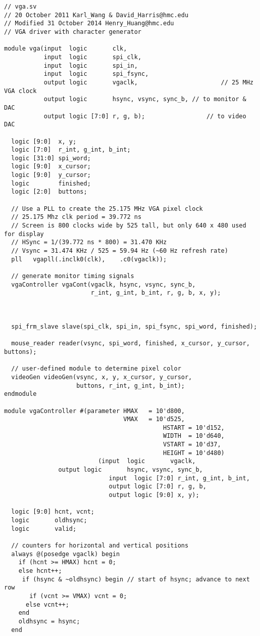 \documentclass{article}
\begin{document}
\begin{verbatim}
// vga.sv
// 20 October 2011 Karl_Wang & David_Harris@hmc.edu
// Modified 31 October 2014 Henry_Huang@hmc.edu
// VGA driver with character generator

module vga(input  logic       clk,
           input  logic       spi_clk,
           input  logic       spi_in,
           input  logic       spi_fsync,
           output logic       vgaclk,						// 25 MHz VGA clock
           output logic       hsync, vsync, sync_b,	// to monitor & DAC
           output logic [7:0] r, g, b);					// to video DAC
 
  logic [9:0]  x, y;
  logic [7:0]  r_int, g_int, b_int;
  logic [31:0] spi_word;
  logic [9:0]  x_cursor;
  logic [9:0]  y_cursor;
  logic        finished;
  logic [2:0]  buttons;
	
  // Use a PLL to create the 25.175 MHz VGA pixel clock 
  // 25.175 Mhz clk period = 39.772 ns
  // Screen is 800 clocks wide by 525 tall, but only 640 x 480 used for display
  // HSync = 1/(39.772 ns * 800) = 31.470 KHz
  // Vsync = 31.474 KHz / 525 = 59.94 Hz (~60 Hz refresh rate)
  pll	vgapll(.inclk0(clk),	.c0(vgaclk)); 

  // generate monitor timing signals
  vgaController vgaCont(vgaclk, hsync, vsync, sync_b,  
                        r_int, g_int, b_int, r, g, b, x, y);
	

  
  spi_frm_slave slave(spi_clk, spi_in, spi_fsync, spi_word, finished);
  
  mouse_reader reader(vsync, spi_word, finished, x_cursor, y_cursor, buttons);
  
  // user-defined module to determine pixel color
  videoGen videoGen(vsync, x, y, x_cursor, y_cursor, 
                    buttons, r_int, g_int, b_int);
endmodule

module vgaController #(parameter HMAX   = 10'd800,
                                 VMAX   = 10'd525, 
											HSTART = 10'd152,
											WIDTH  = 10'd640,
											VSTART = 10'd37,
											HEIGHT = 10'd480)
						  (input  logic       vgaclk, 
               output logic       hsync, vsync, sync_b,
							 input  logic [7:0] r_int, g_int, b_int,
							 output logic [7:0] r, g, b,
							 output logic [9:0] x, y);

  logic [9:0] hcnt, vcnt;
  logic       oldhsync;
  logic       valid;
  
  // counters for horizontal and vertical positions
  always @(posedge vgaclk) begin
    if (hcnt >= HMAX) hcnt = 0;
    else hcnt++;
	 if (hsync & ~oldhsync) begin // start of hsync; advance to next row
	   if (vcnt >= VMAX) vcnt = 0;
      else vcnt++;
    end
    oldhsync = hsync;
  end
  

\end{verbatim}
\end{document}
